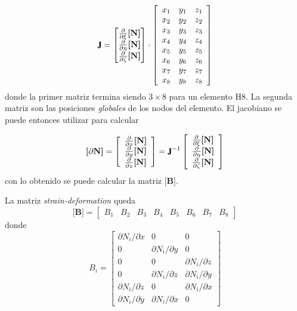 \documentclass[11pt, a4paper,titlepage]{article}
\newcommand{\rmfontbf}[1]{{\fontfamily{ptm}\selectfont%
\textbf{#1}}}
\newcommand{\jac}{\rmfontbf{J}}
\newcommand{\Mme}[1]{\boldsymbol{[}\mathbf{#1} \boldsymbol{]}}
\newcommand{\MB}{\Mme{B}}
\newcommand{\MN}{\Mme{N}}
\begin{document}
\begin{equation}
	\jac = \begin{bmatrix}
	\frac{\partial}{\partial \xi} \MN \\
	\frac{\partial}{\partial \eta} \MN \\
	\frac{\partial}{\partial \zeta} \MN 
	\end{bmatrix}
	\cdot 
\left[\begin{array}{lll}{x_{1}} & {y_{1}} & {z_{1}} \\ {x_{2}} & {y_{2}} & {z_{2}} \\ {x_{3}} & {y_{3}} & {z_{3}} \\ {x_{4}} & {y_{4}} & {z_{4}} \\ {x_{5}} & {y_{5}} & {z_{5}} \\ {x_{6}} & {y_{6}} & {z_{6}} \\ {x_{7}} & {y_{7}} & {z_{7}} \\ {x_{8}} & {y_{8}} & {z_{8}}\end{array}\right]
\end{equation}
donde la primer matriz termina siendo $3\times8$ para un elemento H8. La segunda matriz son las posiciones \textit{globales} de los nodos del elemento. El jacobiano se puede entonces utilizar para calcular

\begin{equation}
	\Mme{\partial N}=\left[\begin{array}{l} \frac{\partial}{\partial x}\MN  \\ \frac{\partial}{\partial y} \MN  \\ \frac{\partial}{\partial z} \MN  \end{array}\right]=\jac^{-1}\left[\begin{array}{l}\frac{\partial}{\partial \xi} \MN \\
	\frac{\partial}{\partial \eta} \MN \\ 
	\frac{\partial}{\partial \zeta} \MN \end{array}\right]
\end{equation}
con lo obtenido se puede calcular la matriz $\MB$.

La matriz \textit{strain-deformation} queda
\[
\MB = \begin{bmatrix}
B_1 &B_2 &B_3 &B_4 &B_5 &B_6 &B_7 &B_8
\end{bmatrix}
\]
donde
\begin{equation}
B_{i}=\left[\begin{array}{ccc}{\partial N_{i} / \partial x} & {0} & {0} \\ {0} & {\partial N_{i} / \partial y} & {0} \\ {0} & {0} & {\partial N_{i} / \partial z} \\ {0} & {\partial N_{i} / \partial z} & {\partial N_{i} / \partial y} \\ {\partial N_{i} / \partial z} & {0} & {\partial N_{i} / \partial x} \\ {\partial N_{i} / \partial y} & {\partial N_{i} / \partial x} & {0}\end{array}\right]
\end{equation}
\end{document}
